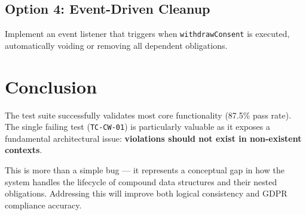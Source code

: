 \documentclass[11pt,a4paper]{article}
\begin{document}
\subsection{Option 4: Event-Driven Cleanup}
Implement an event listener that triggers when \texttt{withdrawConsent} is executed, automatically voiding or removing all dependent obligations.

\section{Conclusion}

The test suite successfully validates most core functionality (87.5\% pass rate). The single failing test (\texttt{TC-CW-01}) is particularly valuable as it exposes a fundamental architectural issue: \textbf{violations should not exist in non-existent contexts}.

This is more than a simple bug --- it represents a conceptual gap in how the system handles the lifecycle of compound data structures and their nested obligations. Addressing this will improve both logical consistency and GDPR compliance accuracy.
\end{document}
